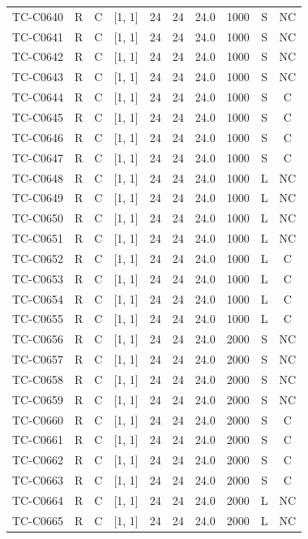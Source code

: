 \begin{longtable}{lccccccccc}
TC-C0640 & R & C & [1, 1] & 24 & 24 & 24.0 & 1000 & S & NC \\
TC-C0641 & R & C & [1, 1] & 24 & 24 & 24.0 & 1000 & S & NC \\
TC-C0642 & R & C & [1, 1] & 24 & 24 & 24.0 & 1000 & S & NC \\
TC-C0643 & R & C & [1, 1] & 24 & 24 & 24.0 & 1000 & S & NC \\
TC-C0644 & R & C & [1, 1] & 24 & 24 & 24.0 & 1000 & S & C \\
TC-C0645 & R & C & [1, 1] & 24 & 24 & 24.0 & 1000 & S & C \\
TC-C0646 & R & C & [1, 1] & 24 & 24 & 24.0 & 1000 & S & C \\
TC-C0647 & R & C & [1, 1] & 24 & 24 & 24.0 & 1000 & S & C \\
TC-C0648 & R & C & [1, 1] & 24 & 24 & 24.0 & 1000 & L & NC \\
TC-C0649 & R & C & [1, 1] & 24 & 24 & 24.0 & 1000 & L & NC \\
TC-C0650 & R & C & [1, 1] & 24 & 24 & 24.0 & 1000 & L & NC \\
TC-C0651 & R & C & [1, 1] & 24 & 24 & 24.0 & 1000 & L & NC \\
TC-C0652 & R & C & [1, 1] & 24 & 24 & 24.0 & 1000 & L & C \\
TC-C0653 & R & C & [1, 1] & 24 & 24 & 24.0 & 1000 & L & C \\
TC-C0654 & R & C & [1, 1] & 24 & 24 & 24.0 & 1000 & L & C \\
TC-C0655 & R & C & [1, 1] & 24 & 24 & 24.0 & 1000 & L & C \\
TC-C0656 & R & C & [1, 1] & 24 & 24 & 24.0 & 2000 & S & NC \\
TC-C0657 & R & C & [1, 1] & 24 & 24 & 24.0 & 2000 & S & NC \\
TC-C0658 & R & C & [1, 1] & 24 & 24 & 24.0 & 2000 & S & NC \\
TC-C0659 & R & C & [1, 1] & 24 & 24 & 24.0 & 2000 & S & NC \\
TC-C0660 & R & C & [1, 1] & 24 & 24 & 24.0 & 2000 & S & C \\
TC-C0661 & R & C & [1, 1] & 24 & 24 & 24.0 & 2000 & S & C \\
TC-C0662 & R & C & [1, 1] & 24 & 24 & 24.0 & 2000 & S & C \\
TC-C0663 & R & C & [1, 1] & 24 & 24 & 24.0 & 2000 & S & C \\
TC-C0664 & R & C & [1, 1] & 24 & 24 & 24.0 & 2000 & L & NC \\
TC-C0665 & R & C & [1, 1] & 24 & 24 & 24.0 & 2000 & L & NC \\

\end{longtable}
